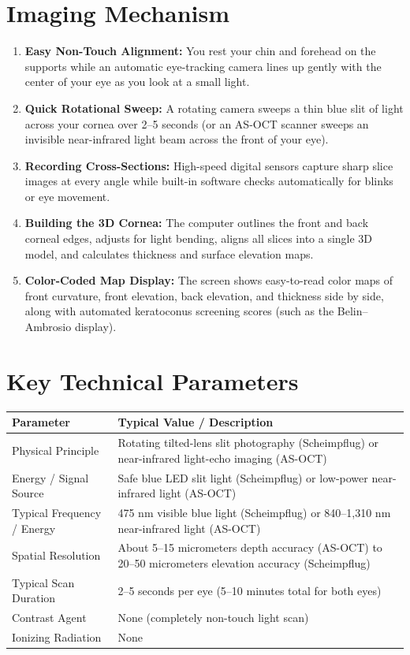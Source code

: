 \section{Imaging Mechanism}
\begin{enumerate}
    \item \textbf{Easy Non-Touch Alignment:} You rest your chin and forehead on the supports while an automatic eye-tracking camera lines up gently with the center of your eye as you look at a small light.
    \item \textbf{Quick Rotational Sweep:} A rotating camera sweeps a thin blue slit of light across your cornea over 2--5 seconds (or an AS-OCT scanner sweeps an invisible near-infrared light beam across the front of your eye).
    \item \textbf{Recording Cross-Sections:} High-speed digital sensors capture sharp slice images at every angle while built-in software checks automatically for blinks or eye movement.
    \item \textbf{Building the 3D Cornea:} The computer outlines the front and back corneal edges, adjusts for light bending, aligns all slices into a single 3D model, and calculates thickness and surface elevation maps.
    \item \textbf{Color-Coded Map Display:} The screen shows easy-to-read color maps of front curvature, front elevation, back elevation, and thickness side by side, along with automated keratoconus screening scores (such as the Belin--Ambrosio display).
\end{enumerate}

\section{Key Technical Parameters}
\noindent
\begin{tabularx}{\textwidth}{@{}l X@{}}
\toprule
\textbf{Parameter} & \textbf{Typical Value / Description} \\
\midrule
Physical Principle & Rotating tilted-lens slit photography (Scheimpflug) or near-infrared light-echo imaging (AS-OCT) \\
Energy / Signal Source & Safe blue LED slit light (Scheimpflug) or low-power near-infrared light (AS-OCT) \\
Typical Frequency / Energy & 475 nm visible blue light (Scheimpflug) or 840--1,310 nm near-infrared light (AS-OCT) \\
Spatial Resolution & About 5--15 micrometers depth accuracy (AS-OCT) to 20--50 micrometers elevation accuracy (Scheimpflug) \\
Typical Scan Duration & 2--5 seconds per eye (5--10 minutes total for both eyes) \\
Contrast Agent & None (completely non-touch light scan) \\
Ionizing Radiation & None \\
\bottomrule
\end{tabularx}

